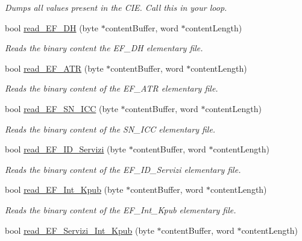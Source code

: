 \begin{DoxyCompactItemize}
\begin{DoxyCompactList}\small\item\em Dumps all values present in the C\+IE. Call this in your loop. \end{DoxyCompactList}\item 
bool \hyperlink{classcie__PN532_a6d85fee99b47537e424bc3326bfa879f}{read\+\_\+\+E\+F\+\_\+\+DH} (byte $\ast$content\+Buffer, word $\ast$content\+Length)
\begin{DoxyCompactList}\small\item\em Reads the binary content the E\+F\+\_\+\+DH elementary file. \end{DoxyCompactList}\item 
bool \hyperlink{classcie__PN532_a8985cb0fb809be1cce9cf8fcfad09bb4}{read\+\_\+\+E\+F\+\_\+\+A\+TR} (byte $\ast$content\+Buffer, word $\ast$content\+Length)
\begin{DoxyCompactList}\small\item\em Reads the binary content of the E\+F\+\_\+\+A\+TR elementary file. \end{DoxyCompactList}\item 
bool \hyperlink{classcie__PN532_ad4398cf9f09198ad20a734b405f35fb6}{read\+\_\+\+E\+F\+\_\+\+S\+N\+\_\+\+I\+CC} (byte $\ast$content\+Buffer, word $\ast$content\+Length)
\begin{DoxyCompactList}\small\item\em Reads the binary content of the S\+N\+\_\+\+I\+CC elementary file. \end{DoxyCompactList}\item 
bool \hyperlink{classcie__PN532_ab8aedeffa797c1b164299c3dd19056d1}{read\+\_\+\+E\+F\+\_\+\+I\+D\+\_\+\+Servizi} (byte $\ast$content\+Buffer, word $\ast$content\+Length)
\begin{DoxyCompactList}\small\item\em Reads the binary content of the E\+F\+\_\+\+I\+D\+\_\+\+Servizi elementary file. \end{DoxyCompactList}\item 
bool \hyperlink{classcie__PN532_a8c60845484ddc5b9767762ab10187e9e}{read\+\_\+\+E\+F\+\_\+\+Int\+\_\+\+Kpub} (byte $\ast$content\+Buffer, word $\ast$content\+Length)
\begin{DoxyCompactList}\small\item\em Reads the binary content of the E\+F\+\_\+\+Int\+\_\+\+Kpub elementary file. \end{DoxyCompactList}\item 
bool \hyperlink{classcie__PN532_a364df50e3080017493eb2d0c3084068d}{read\+\_\+\+E\+F\+\_\+\+Servizi\+\_\+\+Int\+\_\+\+Kpub} (byte $\ast$content\+Buffer, word $\ast$content\+Length)

\end{DoxyCompactItemize}
